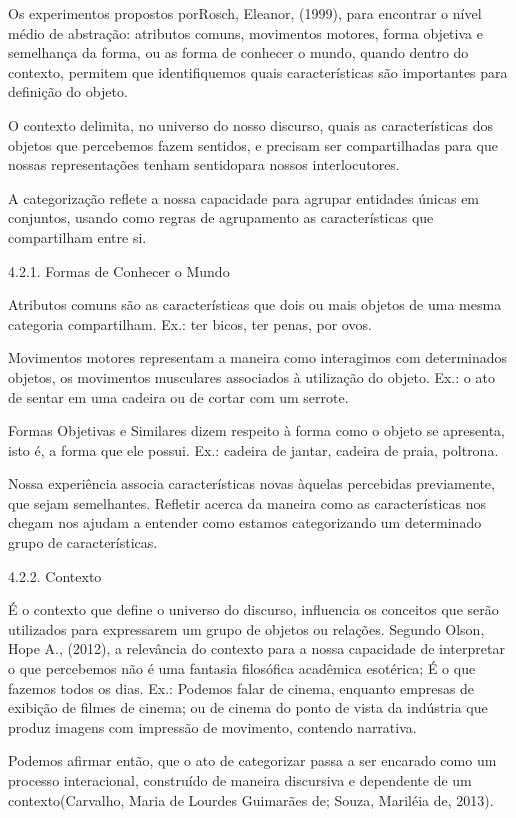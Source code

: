 Os experimentos propostos porRosch, Eleanor, (1999), para encontrar o nível médio de abstração: atributos comuns, movimentos motores, forma objetiva e semelhança da forma, ou as forma de conhecer o mundo, quando dentro do contexto, permitem que identifiquemos quais características são importantes para definição do objeto.

O contexto delimita, no universo do nosso discurso, quais as características dos objetos que percebemos fazem sentidos, e precisam ser compartilhadas para que nossas representações tenham sentidopara nossos interlocutores. 

A categorização reflete a nossa capacidade para agrupar entidades únicas em conjuntos, usando como regras de agrupamento as características que compartilham entre si.

4.2.1. Formas de Conhecer o Mundo

Atributos comuns são as características que dois ou mais objetos de uma mesma categoria compartilham. Ex.: ter bicos, ter penas, por ovos.

Movimentos motores representam a maneira como interagimos com determinados objetos, os movimentos musculares associados à utilização do objeto. Ex.: o ato de sentar em uma cadeira ou de cortar com um serrote.

Formas Objetivas e Similares dizem respeito à forma como o objeto se apresenta, isto é, a forma que ele possui. Ex.: cadeira de jantar, cadeira de praia, poltrona.

Nossa experiência associa características novas àquelas percebidas previamente, que sejam semelhantes. Refletir acerca da maneira como as características nos chegam nos ajudam a entender como estamos categorizando um determinado grupo de características.

4.2.2. Contexto

É o contexto que define o universo do discurso, influencia os conceitos que serão utilizados para expressarem um grupo de objetos ou relações. Segundo Olson, Hope A., (2012), a relevância do contexto para a nossa capacidade de interpretar o que percebemos não é uma fantasia filosófica acadêmica esotérica; É o que fazemos todos os dias. Ex.: Podemos falar de cinema, enquanto empresas de exibição de filmes de cinema; ou de cinema do ponto de vista da indústria que produz imagens com impressão de movimento, contendo narrativa.

Podemos afirmar então, que o ato de categorizar passa a ser encarado como um processo interacional, construído de maneira discursiva e dependente de um contexto(Carvalho, Maria de Lourdes Guimarães de; Souza, Mariléia de, 2013).

